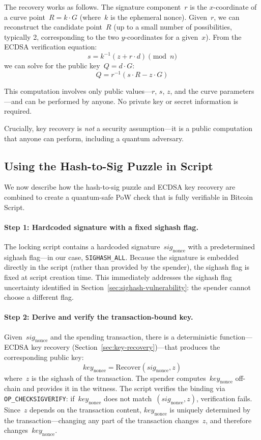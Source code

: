 \documentclass[11pt, a4paper]{article}
\begin{document}
The recovery works as follows. The signature component~$r$ is the $x$-coordinate of a curve point~$R = k \cdot G$ (where~$k$ is the ephemeral nonce). Given~$r$, we can reconstruct the candidate point~$R$ (up to a small number of possibilities, typically 2, corresponding to the two $y$-coordinates for a given~$x$). From the ECDSA verification equation:
$$s = k^{-1}(z + r \cdot d) \pmod{n}$$
we can solve for the public key~$Q = d \cdot G$:
$$Q = r^{-1}(s \cdot R - z \cdot G)$$

This computation involves only public values---$r$, $s$, $z$, and the curve parameters---and can be performed by anyone. No private key or secret information is required.

Crucially, key recovery is \emph{not} a security assumption---it is a public computation that anyone can perform, including a quantum adversary.

\subsection{Using the Hash-to-Sig Puzzle in Script}
\label{sec:puzzle-in-script}

We now describe how the hash-to-sig puzzle and ECDSA key recovery are combined to create a quantum-safe PoW check that is fully verifiable in Bitcoin Script.

\paragraph{Step 1: Hardcoded signature with a fixed sighash flag.}
The locking script contains a hardcoded signature~$\mathit{sig}_{\mathrm{nonce}}$ with a predetermined sighash flag---in our case, \texttt{SIGHASH\_ALL}. Because the signature is embedded directly in the script (rather than provided by the spender), the sighash flag is fixed at script creation time. This immediately addresses the sighash flag uncertainty identified in Section~\ref{sec:sighash-vulnerability}: the spender cannot choose a different flag.

\paragraph{Step 2: Derive and verify the transaction-bound key.}
Given~$\mathit{sig}_{\mathrm{nonce}}$ and the spending transaction, there is a deterministic function---ECDSA key recovery (Section~\ref{sec:key-recovery})---that produces the corresponding public key:
$$\mathit{key}_{\mathrm{nonce}} = \text{Recover}(\mathit{sig}_{\mathrm{nonce}}, z)$$
where~$z$ is the sighash of the transaction. The spender computes~$\mathit{key}_{\mathrm{nonce}}$ off-chain and provides it in the witness. The script verifies the binding via \texttt{OP\_CHECKSIGVERIFY}: if~$\mathit{key}_{\mathrm{nonce}}$ does not match~$(\mathit{sig}_{\mathrm{nonce}}, z)$, verification fails. Since~$z$ depends on the transaction content, $\mathit{key}_{\mathrm{nonce}}$ is uniquely determined by the transaction---changing any part of the transaction changes~$z$, and therefore changes~$\mathit{key}_{\mathrm{nonce}}$.
\end{document}
